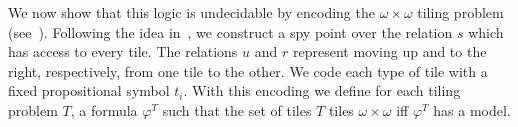 \begin{pf}
\begin{center}
\end{center}

\end{pf}


We now show that this logic is undecidable by encoding the
$\omega\times\omega$ tiling problem (see~\cite{BGG97}). Following
the idea in~\cite{BS95}, we construct a spy point over the relation
$s$ which has access to every tile. The relations $u$ and $r$
represent moving up and to the right, respectively, from one tile to
the other. We code each type of tile with a fixed propositional
symbol $t_i$. With this encoding we define for each tiling problem
$T$, a formula $\varphi^T$ such that the set of tiles $T$ tiles
$\omega\times\omega$ iff $\varphi^T$ has a model.


